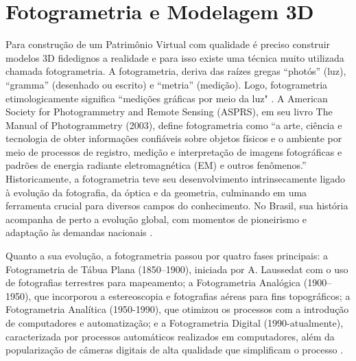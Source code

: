 \section{Fotogrametria e Modelagem 3D}\label{sec:fotogrametria e modelagem 3D}
Para construção de um Patrimônio Virtual com qualidade é preciso construir modelos 3D fidedignos a realidade e para isso existe uma técnica muito utilizada chamada fotogrametria.
A fotogrametria, deriva das raízes gregas “photós” (luz), “gramma” (desenhado ou escrito) e “metria” (medição). Logo, fotogrametria etimologicamente significa “medições gráficas por meio da luz" \citep{Paredes1987}. A American Society for Photogrammetry and Remote Sensing (ASPRS), em seu livro The Manual of Photogrammetry (2003), define fotogrametria como “a arte, ciência e tecnologia de obter informações confiáveis sobre objetos físicos e o ambiente por meio de processos de registro, medição e interpretação de imagens fotográficas e padrões de energia radiante eletromagnética (EM) e outros fenômenos.”
Historicamente, a fotogrametria  teve seu desenvolvimento intrinsecamente ligado à evolução da fotografia, da óptica e da geometria, culminando em uma ferramenta crucial para diversos campos do conhecimento. No Brasil, sua história acompanha de perto a evolução global, com momentos de pioneirismo e adaptação às demandas nacionais \citep{Silva2013}.

Quanto a sua evolução, a fotogrametria passou por quatro fases principais: a Fotogrametria de Tábua Plana (1850–1900), iniciada por A. Laussedat com o uso de fotografias terrestres para mapeamento; a Fotogrametria Analógica (1900–1950), que incorporou a estereoscopia e fotografias aéreas para fins topográficos; a Fotogrametria Analítica (1950-1990), que otimizou os processos com a introdução de computadores e automatização; e a Fotogrametria Digital (1990-atualmente), caracterizada por processos automáticos realizados em computadores, além da popularização de câmeras digitais de alta qualidade que simplificam o processo \citep{Silva2013}.

